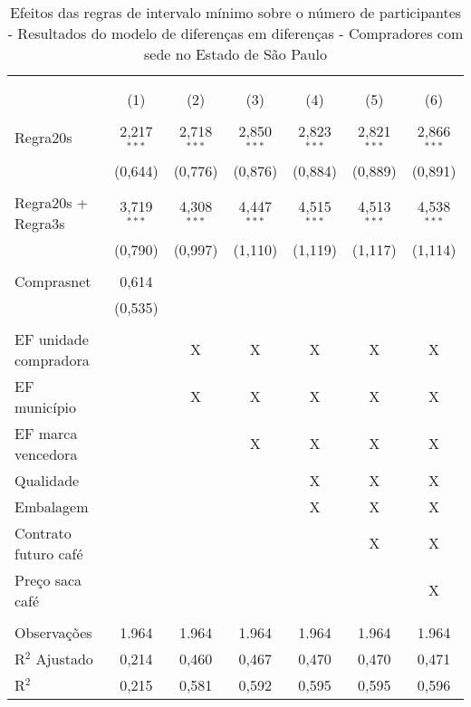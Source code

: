 \setlength{\tabcolsep}{3pt}
\begin{table}[!htbp]
\centering
\begin{threeparttable}
\centering 
  \caption{Efeitos das regras de intervalo mínimo sobre o número de participantes - Resultados do modelo de diferenças em diferenças - Compradores com sede no Estado de São Paulo}
  \label{dd_results_participantes_sp} 
\begin{tabular}{lcccccc}
\\[-1.8ex]\hline 
\hline \\[-1.8ex] 
\\[-1.8ex] & (1) & (2) & (3) & (4) & (5) & (6) \\ 
\hline \\[-1.8ex] 

 Regra20s & 2,217$^{***}$ & 2,718$^{***}$ & 2,850$^{***}$ & 2,823$^{***}$ & 2,821$^{***}$ & 2,866$^{***}$ \\ 
  & (0,644) & (0,776) & (0,876) & (0,884) & (0,889) & (0,891) \\ 
  & & & & & & \\ 
 Regra20s + Regra3s & 3,719$^{***}$ & 4,308$^{***}$ & 4,447$^{***}$ & 4,515$^{***}$ & 4,513$^{***}$ & 4,538$^{***}$ \\ 
  & (0,790) & (0,997) & (1,110) & (1,119) & (1,117) & (1,114) \\ 
  & & & & & & \\ 

Comprasnet & 0,614 &  &  &  &  &  \\ 
  & (0,535) &  &  &  &  & \\ 
  & & & & & & \\ 

 EF unidade compradora & & X & X & X & X & X \\ 
 EF município & & X & X & X & X & X \\ 
 EF marca vencedora & & & X & X & X & X \\ 
 Qualidade & & & & X & X & X \\ 
 Embalagem & & & & X & X & X \\ 
 Contrato futuro café &  &  &  &  & X & X \\ 
 Preço saca café & & & & & & X \\ 
\hline \\[-1.8ex]  

Observações & 1.964 & 1.964 & 1.964 & 1.964 & 1.964 & 1.964 \\ 
R$^{2}$ Ajustado & 0,214 & 0,460 & 0,467 & 0,470 & 0,470 & 0,471 \\ 
R$^{2}$  & 0,215 & 0,581 & 0,592 & 0,595 & 0,595 & 0,596 \\ 
\hline 


\end{tabular}
\end{threeparttable}
\end{table}
